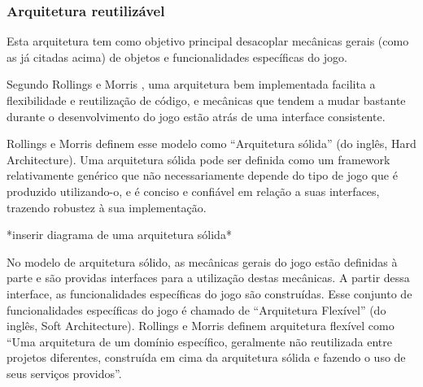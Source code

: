 \subsubsection{Arquitetura reutilizável}

Esta arquitetura tem como objetivo principal desacoplar mecânicas gerais (como as já citadas acima) de objetos e funcionalidades específicas do jogo.

Segundo Rollings e Morris \cite{rollings2004game}, uma arquitetura bem implementada facilita a flexibilidade e reutilização de código, e mecânicas que tendem a mudar bastante durante o desenvolvimento do jogo estão atrás de uma interface consistente.

Rollings e Morris \cite{rollings2004game} definem esse modelo como “Arquitetura sólida” (do inglês, Hard Architecture). Uma arquitetura sólida pode ser definida como um framework relativamente genérico que não necessariamente depende do tipo de jogo que é produzido utilizando-o, e é conciso e confiável em relação a suas interfaces, trazendo robustez à sua implementação.

*inserir diagrama de uma arquitetura sólida*

No modelo de arquitetura sólido, as mecânicas gerais do jogo estão definidas à parte e são providas interfaces para a utilização destas mecânicas. A partir dessa interface, as funcionalidades específicas do jogo são construídas. Esse conjunto de funcionalidades específicas do jogo é chamado de “Arquitetura Flexível” (do inglês, Soft Architecture). Rollings e Morris \cite{rollings2004game} definem arquitetura flexível como “Uma arquitetura de um domínio específico, geralmente não reutilizada entre projetos diferentes, construída em cima da arquitetura sólida e fazendo o uso de seus serviços providos”.
